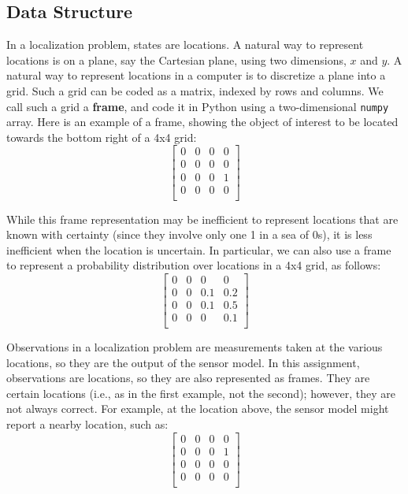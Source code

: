 \documentclass{article}
\begin{document}
\subsection{Data Structure}

In a localization problem, states are locations.
A natural way to represent locations is on a plane, say the Cartesian plane, using two dimensions, $x$ and $y$.
A natural way to represent locations in a computer is to discretize a plane into a grid.
Such a grid can be coded as a matrix, indexed by rows and columns.
We call such a grid a \textbf{frame}, and code it in Python using a two-dimensional \verb|numpy| array.
Here is an example of a frame, showing the object of interest
to be located towards the bottom right of a 4x4 grid:
\[
\begin{bmatrix}
0 & 0 & 0 & 0 \\
0 & 0 & 0 & 0 \\
0 & 0 & 0 & 1 \\
0 & 0 & 0 & 0 \\
\end{bmatrix}
\]

While this frame representation may be inefficient to represent locations that are known with certainty
(since they involve only one 1 in a sea of 0s), it is less inefficient when the location is uncertain.
In particular, we can also use a frame to represent a probability distribution over locations in a 4x4 grid,
as follows:
\[
\begin{bmatrix}
0 & 0 & 0 & 0 \\
0 & 0 & 0.1 & 0.2 \\
0 & 0 & 0.1 & 0.5 \\
0 & 0 & 0 & 0.1 \\
\end{bmatrix}
\]

Observations in a localization problem are measurements taken at the
various locations, so they are the output of the sensor model.  In
this assignment, observations are locations, so they are also
represented as frames.  They are certain locations (i.e., as in the
first example, not the second); however, they are not always correct.
For example, at the location above, the sensor model might report a
nearby location, such as:
\[
\begin{bmatrix}
0 & 0 & 0 & 0 \\
0 & 0 & 0 & 1 \\
0 & 0 & 0 & 0 \\
0 & 0 & 0 & 0 \\
\end{bmatrix}
\]
\end{document}
